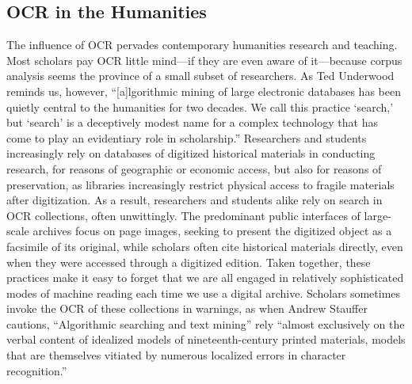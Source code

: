 \documentclass[twoside,11pt]{report}
\begin{document}
\subsection{OCR in the Humanities}

The influence of OCR pervades contemporary humanities research and teaching. Most scholars pay OCR little mind---if they are even aware of it---because corpus analysis seems the province of a small subset of researchers. As Ted Underwood \citeyearpar[p.~64]{Underwood:2014ep} reminds us, however, ``[a]lgorithmic mining of large electronic databases has been quietly central to the humanities for two decades. We call this practice `search,' but `search' is a deceptively modest name for a complex technology that has come to play an evidentiary role in scholarship.'' Researchers and students increasingly rely on databases of digitized historical materials in conducting research, for reasons of geographic or economic access, but also for reasons of preservation, as libraries increasingly restrict physical access to fragile materials after digitization. As a result, researchers and students alike rely on search in OCR collections, often unwittingly. The predominant public interfaces of large-scale archives focus on page images, seeking to present the digitized object as a facsimile of its original, while scholars often cite historical materials directly, even when they were accessed through a digitized edition. Taken together, these practices make it easy to forget that we are all engaged in relatively sophisticated modes of machine reading each time we use a digital archive. Scholars sometimes invoke the OCR of these collections in warnings, as when Andrew Stauffer \citeyearpar{stauffer12:_ninet_centur_archiv_digit_age} cautions, ``Algorithmic searching and text mining'' rely ``almost exclusively on the verbal content of idealized models of nineteenth-century printed materials, models that are themselves vitiated by numerous localized errors in character recognition.''
\end{document}
